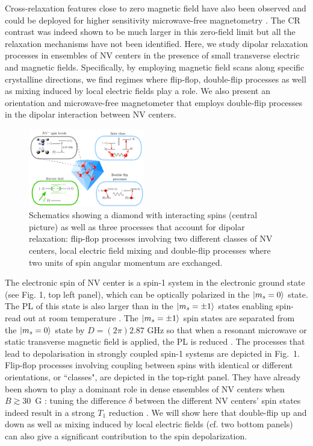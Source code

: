 \documentclass[preprintnumbers,amsmath,amssymb,superscriptaddress,twocolumn,showpacs]{revtex4-2}
\begin{document}
Cross-relaxation features close to zero magnetic field have also been observed and could be deployed for higher sensitivity microwave-free magnetometry \cite{filimonenko2018weak, filimonenko2022manifestation}.
The CR contrast was indeed shown to be much larger in this zero-field limit \citep{jarmola_longitudinal_2015,  mrozek_longitudinal_2015} but all the relaxation mechanisms have not been identified.
Here, we study dipolar relaxation processes in ensembles of NV centers in the presence of small transverse electric and magnetic fields. Specifically, by employing magnetic field scans along specific crystalline directions, we find regimes where flip-flop, double-flip processes as well as mixing induced by local electric fields play a role. We also present an orientation and microwave-free magnetometer that employs double-flip processes in the dipolar interaction between NV centers.

\begin{figure}
\includegraphics[width=0.45\textwidth]{shema_summary.pdf}
\caption{Schematics showing a diamond with interacting spins (central picture) as well as three processes that account for dipolar relaxation: flip-flop processes involving two different classes of NV centers, local electric field mixing and double-flip processes where two units of spin angular momentum are exchanged. }
\label{schema_intro}
\end{figure}

The electronic spin of NV center is a spin-1 system in the electronic ground state (see Fig. 1, top left panel), which can be optically polarized in the $\ket{m_s=0}$ state. The PL of this state is also larger than in the $\ket{m_s=\pm 1}$ states enabling spin-read out at room temperature \cite{DOHERTY20131}. The $\ket{m_s=\pm 1}$ spin states are separated from the $\ket{m_s=0}$ state by  $D = (2\pi) 2.87$ GHz so that when a resonant microwave or static transverse magnetic field is applied, the PL is reduced \citep{epstein2005anisotropic,lai2009influence}.  The processes that lead to depolarisation in strongly coupled spin-1 systems are depicted in Fig.~1. Flip-flop processes involving coupling between spins with identical or different orientations, or ``classes", are depicted in the top-right panel. They have already been shown to play a dominant role in dense ensembles of NV centers when $B \gtrsim 30$~G : tuning the difference $\delta$ between the different NV centers' spin states indeed result in a strong $T_1$ reduction \cite{choi_observation_2017}.  We will show here that double-flip up and down as well as mixing induced by local electric fields (cf. two bottom panels) can also give a significant contribution to the spin depolarization.
\end{document}

